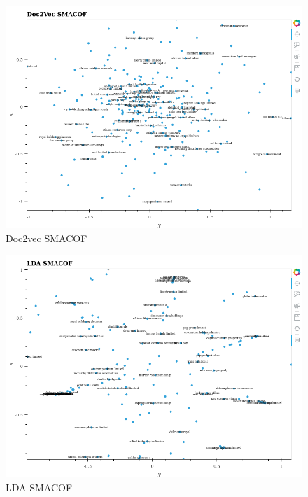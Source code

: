\documentclass[11pt]{article}
\makeatletter
\def\maxwidth{\ifdim\Gin@nat@width>\linewidth\linewidth
    \else\Gin@nat@width\fi}
\let\Oldincludegraphics\includegraphics
\renewcommand{\includegraphics}[1]{\Oldincludegraphics[width=.8\maxwidth]{#1}}
\makeatother
\begin{document}
\begin{figure}
\centering
\includegraphics{../experiments/media/Doc2Vec SMACOF.png}
\caption{Doc2vec SMACOF}
\end{figure}

\begin{figure}
\centering
\includegraphics{../experiments/media/LDA SMACOF.png}
\caption{LDA SMACOF}
\end{figure}
\end{document}
